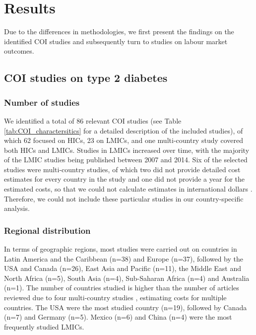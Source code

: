 \section{Results}
Due to the differences in methodologies, we first present the findings on the identified \ac{COI} studies and subsequently turn to studies on labour market outcomes.

\subsection{\acs*{COI} studies on type 2 diabetes}

\subsubsection*{Number of studies}
We identified a total of 86 relevant \ac{COI} studies (see Table \ref{tab:COI_charactersitics} for a detailed description of the included studies), of which 62 focused on \acp{HIC}, 23 on \acp{LMIC}, and one multi-country study covered both \acp{HIC} and \acp{LMIC}. Studies in \acp{LMIC} increased over time, with the majority of the \ac{LMIC} studies being published between 2007 and 2014. Six of the selected studies were multi-country studies, of which two \parencite{Kirigia2009,Smith-Spangler2012} did not provide detailed cost estimates for every country in the study and one did not provide a year for the estimated costs, so that we could not calculate estimates in international dollars \parencite{Boutayeb2014}. Therefore, we could not include these particular studies in our country-specific analysis.

\subsubsection*{Regional distribution}
In terms of geographic regions, most studies were carried out on countries in Latin America and the Caribbean (n=38) and Europe (n=37), followed by the USA and Canada (n=26), East Asia and Pacific (n=11), the Middle East and North Africa (n=5), South Asia (n=4), Sub-Saharan Africa (n=4) and Australia (n=1). The number of countries studied is higher than the number of articles reviewed due to four multi-country studies \parencite{Boutayeb2014,Barcelo2003,Jonsson2002b,Abdulkadri2009b}, estimating costs for multiple countries. The USA were the most studied country (n=19), followed by Canada (n=7) and Germany (n=5). Mexico (n=6) and China (n=4) were the most frequently studied \acp{LMIC}.


